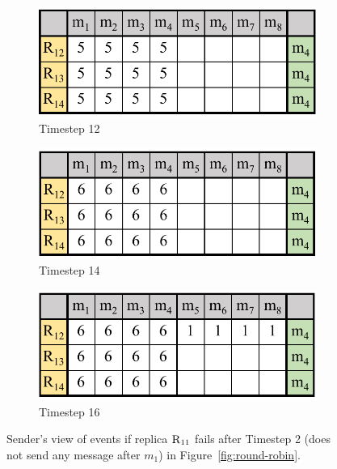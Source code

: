 \begin{figure}[t]
     \begin{subfigure}[b]{0.3\columnwidth}
         \centering
         \includegraphics[width=\textwidth]{fail-quack4.pdf}
         \caption{Timestep 12}
         \label{usfig:init-ack}
     \end{subfigure}
     \begin{subfigure}[b]{0.3\columnwidth}
         \centering
         \includegraphics[width=\textwidth]{fail-quack5.pdf}
         \caption{Timestep 14}
         \label{usfig:first-ack}
     \end{subfigure}
     \begin{subfigure}[b]{0.3\columnwidth}
         \centering
         \includegraphics[width=\textwidth]{fail-quack6.pdf}
         \caption{Timestep 16}
         \label{usfig:second-ack}
     \end{subfigure}
    \caption{Sender's view of events if replica $\textsc{R}_{{1}{1}}$ fails after Timestep 2 (does not send any message after $m_1$) in Figure~\ref{fig:round-robin}. }
    \label{fig:fail-quack-counter}
\end{figure}

